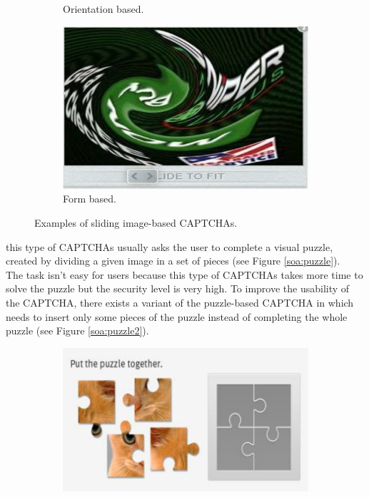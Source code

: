 \begin{itemize}
{\begin{figure}[h]
\begin{subfigure}[b]{0.48\textwidth}
	     \caption{\footnotesize{Orientation based.}}
     \end{subfigure}
     \hfill
     \begin{subfigure}[b]{0.48\textwidth}
         \centering
         \includegraphics[width=.9\linewidth]{Images/StateOfArt/sliding_image_CAPTCHA2}
	     \caption{\footnotesize{Form based.}}
     \end{subfigure}
     \caption{\footnotesize{Examples of sliding image-based CAPTCHAs.}}
     \label{soa:sliding_image}
\end{figure}
}
{this type of CAPTCHAs usually asks the user to complete a visual puzzle, created by dividing a given image in a set of pieces\cite{survey_CAPTCHA} (see Figure \ref{soa:puzzle}).\\
The task isn't easy for users because this type of CAPTCHAs takes more time to solve the puzzle but the security level is very high\cite{survey_CAPTCHA}. To improve the usability of the CAPTCHA, there exists a variant of the puzzle-based CAPTCHA in which needs to insert only some pieces of the puzzle instead of completing the whole puzzle (see Figure \ref{soa:puzzle2}).
\begin{figure}[h]
     \centering
     \begin{subfigure}[b]{0.48\textwidth}
         \centering
         \includegraphics[width=.6\linewidth]{Images/StateOfArt/puzzle_CAPTCHA}

\end{subfigure}
\end{figure}}
\end{itemize}
